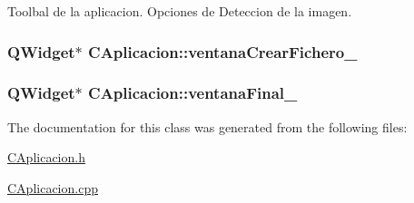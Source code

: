 Toolbal de la aplicacion. Opciones de Deteccion de la imagen. 

\subsubsection[{\texorpdfstring{ventana\+Crear\+Fichero\+\_\+}{ventanaCrearFichero_}}]{\setlength{\rightskip}{0pt plus 5cm}Q\+Widget$\ast$ C\+Aplicacion\+::ventana\+Crear\+Fichero\+\_\+\hspace{0.3cm}{\ttfamily [private]}}\hypertarget{classCAplicacion_a8887fbd8545bcf5450e48213019b9596}{}\label{classCAplicacion_a8887fbd8545bcf5450e48213019b9596}
\subsubsection[{\texorpdfstring{ventana\+Final\+\_\+}{ventanaFinal_}}]{\setlength{\rightskip}{0pt plus 5cm}Q\+Widget$\ast$ C\+Aplicacion\+::ventana\+Final\+\_\+\hspace{0.3cm}{\ttfamily [private]}}\hypertarget{classCAplicacion_ab28e00903a21b19a023e3762bea723c6}{}\label{classCAplicacion_ab28e00903a21b19a023e3762bea723c6}


The documentation for this class was generated from the following files\+:\begin{DoxyCompactItemize}
\item 
\hyperlink{CAplicacion_8h}{C\+Aplicacion.\+h}\item 
\hyperlink{CAplicacion_8cpp}{C\+Aplicacion.\+cpp}\end{DoxyCompactItemize}
